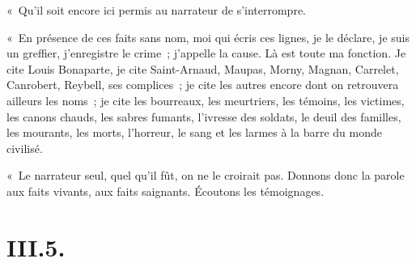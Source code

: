 \documentclass[french,twoside]{book} %
\begin{document}
« Qu’il soit encore ici permis au narrateur de s’interrompre.\par
« En présence de ces faits sans nom, moi qui écris ces lignes, je le déclare, je suis un greffier, j’enregistre le crime ; j’appelle la cause. Là est toute ma fonction. Je cite Louis Bonaparte, je cite Saint-Arnaud, Maupas, Morny, Magnan, Carrelet, Canrobert, Reybell, ses complices ; je cite les autres encore dont on retrouvera ailleurs les noms ; je cite les bourreaux, les meurtriers, les témoins, les victimes, les canons chauds, les sabres fumants, l’ivresse des soldats, le deuil des familles, les mourants, les morts, l’horreur, le sang et les larmes à la barre du monde civilisé.\par
« Le narrateur seul, quel qu’il fût, on ne le croirait pas. Donnons donc la parole aux faits vivants, aux faits saignants. Écoutons les témoignages.

\section[{III.5.}]{III.5.}
\end{document}
